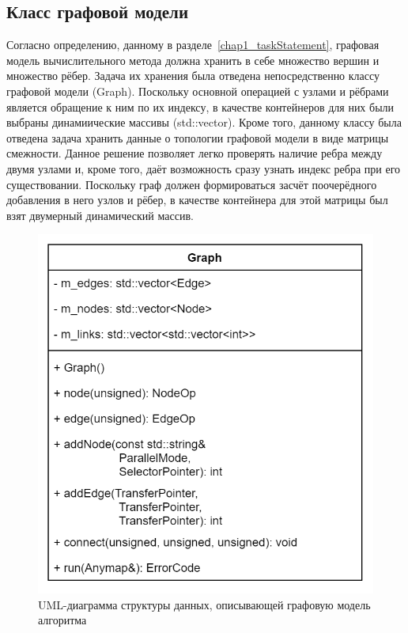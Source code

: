 \subsection{Класс графовой модели}
Согласно определению, данному в разделе~\ref{chap1_taskStatement}, графовая модель вычислительного метода должна хранить в себе множество вершин и множество рёбер. Задача их хранения была отведена непосредственно классу графовой модели (\textsf{Graph}). Поскольку основной операцией с узлами и рёбрами является обращение к ним по их индексу, в качестве контейнеров для них были выбраны динамиические массивы (\textsf{std::vector}). Кроме того, данному классу была отведена задача хранить данные о топологии графовой модели в виде матрицы смежности. Данное решение позволяет легко проверять наличие ребра между двумя узлами и, кроме того, даёт возможность сразу узнать индекс ребра при его существовании. Поскольку граф должен формироваться засчёт поочерёдного добавления в него узлов и рёбер, в качестве контейнера для этой матрицы был взят двумерный динамический массив.

\begin{figure}[!ht]
    \centering
    \includegraphics[height=0.33\textheight]{figures/class.graph.png}
    \caption{UML-диаграмма структуры данных, описывающей графовую модель алгоритма}
    \label{fig:UMLGraph}
\end{figure}

